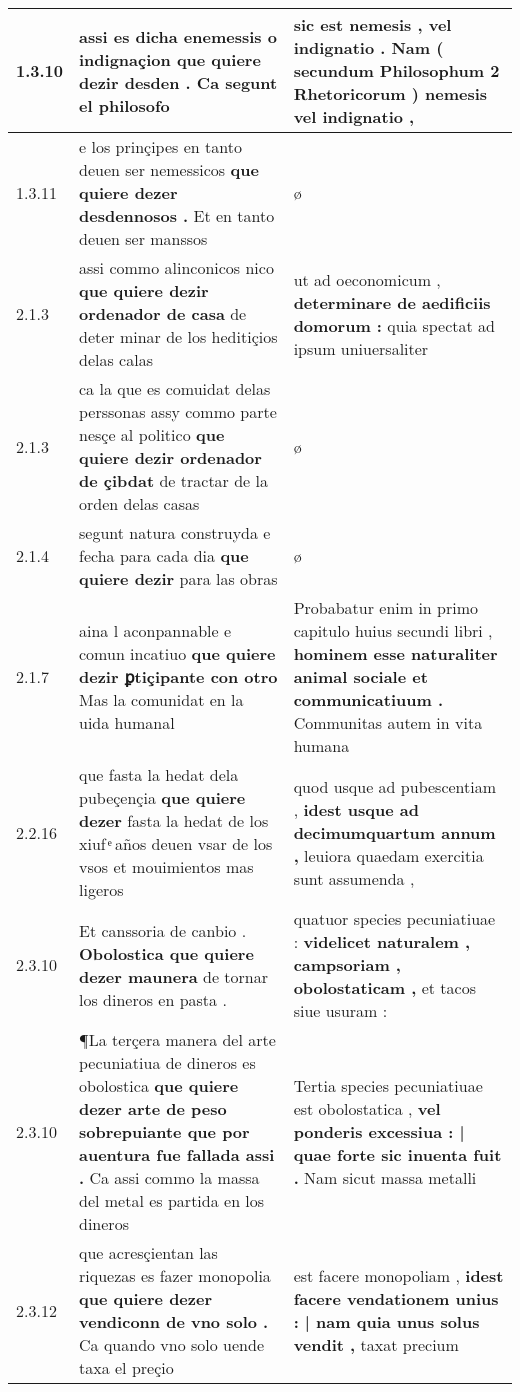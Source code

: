 \begin{tabular}{|p{1cm}|p{6.5cm}|p{6.5cm}|}
1.3.10 & assi es dicha enemessis o indignaçion \textbf{ que quiere dezir desden . } Ca segunt el philosofo & sic est nemesis , vel indignatio . \textbf{ Nam ( secundum Philosophum 2 Rhetoricorum ) } nemesis vel indignatio , \\\hline
1.3.11 & e los prinçipes en tanto deuen ser nemessicos \textbf{ que quiere dezer desdennosos . } Et en tanto deuen ser manssos & ø \\\hline
2.1.3 & assi commo alinconicos nico \textbf{ que quiere dezir ordenador de casa } de deter minar de los heditiçios delas calas & ut ad oeconomicum , \textbf{ determinare de aedificiis domorum : } quia spectat ad ipsum uniuersaliter \\\hline
2.1.3 & ca la que es comuidat delas perssonas assy commo parte nesçe al politico \textbf{ que quiere dezir ordenador de çibdat } de tractar de la orden delas casas & ø \\\hline
2.1.4 & segunt natura construyda e fecha para cada dia \textbf{ que quiere dezir } para las obras & ø \\\hline
2.1.7 & aina l aconpannable e comun incatiuo \textbf{ que quiere dezir ꝑtiçipante con otro } Mas la comunidat en la uida humanal & Probabatur enim in primo capitulo huius secundi libri , \textbf{ hominem esse naturaliter animal sociale et communicatiuum . } Communitas autem in vita humana \\\hline
2.2.16 & que fasta la hedat dela pubeçençia \textbf{ que quiere dezer } fasta la hedat de los xiuf ͤ años deuen vsar de los vsos et mouimientos mas ligeros & quod usque ad pubescentiam , \textbf{ idest usque ad decimumquartum annum , } leuiora quaedam exercitia sunt assumenda , \\\hline
2.3.10 & Et canssoria de canbio . \textbf{ Obolostica que quiere dezer maunera } de tornar los dineros en pasta . & quatuor species pecuniatiuae : \textbf{ videlicet naturalem , campsoriam , obolostaticam , } et tacos siue usuram : \\\hline
2.3.10 & ¶La terçera manera del arte pecuniatiua de dineros es obolostica \textbf{ que quiere dezer arte de peso sobrepuiante que por auentura fue fallada assi . } Ca assi commo la massa del metal es partida en los dineros & Tertia species pecuniatiuae est obolostatica , \textbf{ vel ponderis excessiua : | quae forte sic inuenta fuit . } Nam sicut massa metalli \\\hline
2.3.12 & que acresçientan las riquezas es fazer monopolia \textbf{ que quiere dezer vendiconn de vno solo . } Ca quando vno solo uende taxa el preçio & est facere monopoliam , \textbf{ idest facere vendationem unius : | nam quia unus solus vendit , } taxat precium \\\hline

\end{tabular}
